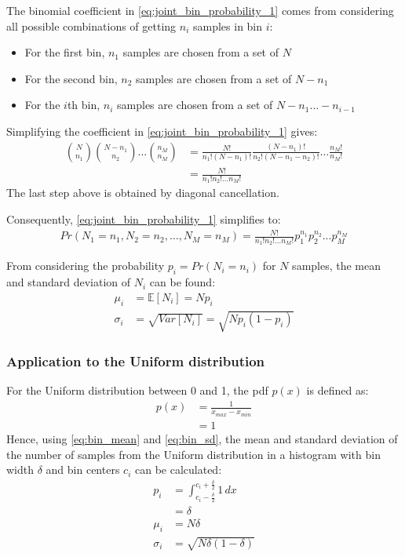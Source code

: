\documentclass[a4paper]{article}
\begin{document}
The binomial coefficient in \autoref{eq:joint_bin_probability_1} comes from considering all possible combinations of
getting $n_i$ samples in bin $i$:
\begin{itemize}
    \item For the first bin, $n_1$ samples are chosen from a set of $N$
    \item For the second bin, $n_2$ samples are chosen from a set of $N - n_1$
    \item For the $i$th bin, $n_i$ samples are chosen from a set of $N - n_1 \dots - n_{i-1}$
\end{itemize}
Simplifying the coefficient in \autoref{eq:joint_bin_probability_1} gives:
\begin{align*}
    {N \choose n_1}{N - n_1 \choose n_2} \dots {n_M \choose n_M}
  & = \frac{N!}{n_1!(N - n_1)!} \frac{(N - n_1)!}{n_2!(N - n_1 - n_2)!} \dots \frac{n_M!}{n_M!} \\
  & = \frac{N!}{n_1! n_2! \dots n_M!}
\end{align*}
The last step above is obtained by diagonal cancellation.

Consequently, \autoref{eq:joint_bin_probability_1} simplifies to:
\begin{align*}
    Pr(N_1 = n_1, N_2 = n_2, \dots, N_M = n_M) = \frac{N!}{n_1! n_2! \dots n_M!} p_1^{n_1} p_2^{n_2} ... p_M^{n_M}
\end{align*}

From considering the probability $p_i = Pr(N_i = n_i)$ for $N$ samples, the mean and standard deviation of $N_i$ can be
found:
\begin{align}
    \label{eq:bin_mean}
    \mu_i &= \mathbb{E}[N_i] = N p_i \\
    \label{eq:bin_sd}
    \sigma_i &= \sqrt{Var[N_i]} = \sqrt{N p_i (1 - p_i)}
\end{align}


\subsubsection{Application to the Uniform distribution}
For the Uniform distribution between 0 and 1, the pdf $p(x)$ is defined as:
\begin{align*}
    p(x) &= \frac{1}{x_{max} - x_{min}} \\
         &= 1
\end{align*}
Hence, using \autoref{eq:bin_mean} and \autoref{eq:bin_sd}, the mean and standard deviation of the number of samples
from the Uniform distribution in a histogram with bin width $\delta$ and bin centers $c_i$ can be calculated:
\begin{align*}
    p_i &= \int_{c_i - \frac{\delta}{2}}^{c_i + \frac{\delta}{2}}1\,dx \\
        &= \delta \\
    \mu_i &= N \delta \\
    \sigma_i &= \sqrt{N \delta (1 - \delta)}
\end{align*}
\end{document}

